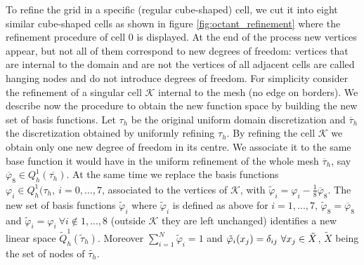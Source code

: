 \documentclass[11pt,a4paper]{article}
\begin{document}
To refine the grid in a specific (regular cube-shaped) cell, we cut it into eight similar cube-shaped cells as shown in figure \ref{fig:octant_refinement} where the refinement procedure of cell 0 is displayed. At the end of the process new vertices appear, but not all of them correspond to new degrees of freedom: vertices that are internal to the domain and are not the vertices of all adjacent cells are called hanging nodes and do not introduce degrees of freedom. For simplicity consider the refinement of a singular cell \(\mathcal{K}\) internal to the mesh (no edge on borders). We describe now the procedure to obtain the new function space by building the new set of basis functions. Let \(\tau_h\) be the original uniform domain discretization and \(\overline{\tau}_h\) the discretization obtained by uniformly refining \(\tau_h\). By refining the cell \(\mathcal{K}\) we obtain only one new degree of freedom in its centre. We associate it to the same base function it would have in the uniform refinement of the whole mesh \(\overline{\tau}_h\), say \(\overline{\varphi}_8\in Q_h^1(\overline{\tau_h})\). At the same time we replace the basis functions \(\varphi_i \in Q_h^1(\tau_h,\ i=0,...,7\), associated to the vertices of \(\mathcal{K}\), with \(\tilde{\varphi}_i=\varphi_i-\frac{1}{8}\overline{\varphi}_8\). The new set of basis functions \(\tilde{\varphi}_i\) where \(\tilde{\varphi}_i\) is defined as above for \(i=1,...,7\), \(\tilde{\varphi}_8=\overline{\varphi}_8\) and \(\tilde{\varphi}_i = \varphi_i\ \forall i \notin 1,...,8\) (outside \(\mathcal{K}\) they are left unchanged) identifies a new linear space \(\tilde{Q}_h^1(\tilde{\tau}_h)\). Moreover \(\sum_{i=1}^N\tilde{\varphi}_i=1\) and \(\Tilde{\varphi}_i(x_j)=\delta_{ij}\ \forall x_j\in \tilde{X}\), \(\tilde{X}\) being the set of nodes of \(\tilde{\tau_h}\).
\end{document}
